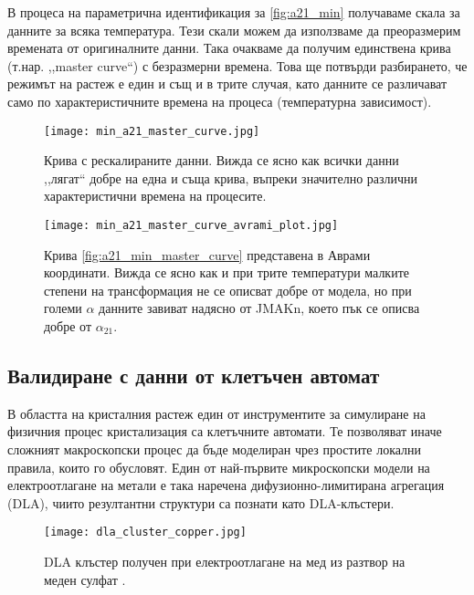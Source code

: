 В процеса на параметрична идентификация за \autoref{fig:a21_min} получаваме скала за данните за всяка температура. Тези скали можем да използваме да преоразмерим времената от оригиналните данни. Така очакваме да получим единствена крива (т.нар. ,,master curve``) с безразмерни времена. Това ще потвърди разбирането, че режимът на растеж е един и същ и в трите случая, като данните се различават само по характеристичните времена на процеса (температурна зависимост).
\begin{figure}[hbpt]
    \centering
    \texttt{[image: min\_a21\_master\_curve.jpg]}
    \caption{Крива с рескалираните данни. Вижда се ясно как всички данни ,,лягат`` добре на една и съща крива, въпреки значително различни характеристични времена на процесите.} 
    \label{fig:a21_min_master_curve}
\end{figure}
\begin{figure}[hbpt]
    \centering
    \texttt{[image: min\_a21\_master\_curve\_avrami\_plot.jpg]}
    \caption{Крива \autoref{fig:a21_min_master_curve} представена в Аврами координати. Вижда се ясно как и при трите температури малките степени на трансформация не се описват добре от модела, но при големи $\alpha$ данните завиват надясно от JMAKn, което пък се описва добре от $\alpha_{21}$.}
    \label{fig:a21_min_master_curve_avrami}
\end{figure}

\subsection{Валидиране с данни от клетъчен автомат}
В областта на кристалния растеж един от инструментите за симулиране на физичния процес кристализация са клетъчните автомати. Те позволяват иначе сложният макроскопски процес да бъде моделиран чрез простите локални правила, които го обусловят. Един от най-първите микроскопски модели на електроотлагане на метали е така наречена дифузионно-лимитирана агрегация (DLA), чиито резултантни структури са познати като DLA-клъстери. 
\begin{figure}[hbpt]
    \centering
    \texttt{[image: dla\_cluster\_copper.jpg]}
    \caption{DLA клъстер получен при електроотлагане на мед из разтвор на меден сулфат \cite{dla_copper}.}
    \label{fig:dla_cluster_wikimedia}
\end{figure}

